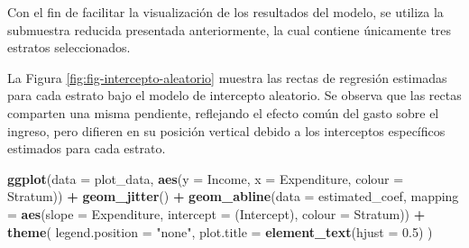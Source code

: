 \documentclass[
  spanish,
  12pt,
]{book}
\newenvironment{Shaded}{\begin{snugshade}}{\end{snugshade}}
\newcommand{\AttributeTok}[1]{\textcolor[rgb]{0.13,0.29,0.53}{#1}}
\newcommand{\FloatTok}[1]{\textcolor[rgb]{0.00,0.00,0.81}{#1}}
\newcommand{\FunctionTok}[1]{\textcolor[rgb]{0.13,0.29,0.53}{\textbf{#1}}}
\newcommand{\NormalTok}[1]{#1}
\newcommand{\OtherTok}[1]{\textcolor[rgb]{0.56,0.35,0.01}{#1}}
\newcommand{\SpecialCharTok}[1]{\textcolor[rgb]{0.81,0.36,0.00}{\textbf{#1}}}
\newcommand{\StringTok}[1]{\textcolor[rgb]{0.31,0.60,0.02}{#1}}
\newcounter{none} %
\begin{document}
Con el fin de facilitar la visualización de los resultados del modelo, se utiliza la submuestra reducida presentada anteriormente, la cual contiene únicamente tres estratos seleccionados.

\begin{Shaded}
\end{Shaded}

La Figura \ref{fig:fig-intercepto-aleatorio} muestra las rectas de regresión estimadas para cada estrato bajo el modelo de intercepto aleatorio. Se observa que las rectas comparten una misma pendiente, reflejando el efecto común del gasto sobre el ingreso, pero difieren en su posición vertical debido a los interceptos específicos estimados para cada estrato.

\begin{Shaded}
\begin{Highlighting}[]
\FunctionTok{ggplot}\NormalTok{(}\AttributeTok{data =}\NormalTok{ plot\_data,}
       \FunctionTok{aes}\NormalTok{(}\AttributeTok{y =}\NormalTok{ Income, }\AttributeTok{x =}\NormalTok{ Expenditure, }\AttributeTok{colour =}\NormalTok{ Stratum)) }\SpecialCharTok{+}
  \FunctionTok{geom\_jitter}\NormalTok{() }\SpecialCharTok{+}
  \FunctionTok{geom\_abline}\NormalTok{(}\AttributeTok{data =}\NormalTok{ estimated\_coef,}
              \AttributeTok{mapping =} \FunctionTok{aes}\NormalTok{(}\AttributeTok{slope =}\NormalTok{ Expenditure,}
                            \AttributeTok{intercept =} \StringTok{\textasciigrave{}}\AttributeTok{(Intercept)}\StringTok{\textasciigrave{}}\NormalTok{,}
                            \AttributeTok{colour =}\NormalTok{ Stratum)) }\SpecialCharTok{+}
  \FunctionTok{theme}\NormalTok{(}
    \AttributeTok{legend.position =} \StringTok{"none"}\NormalTok{,}
    \AttributeTok{plot.title =} \FunctionTok{element\_text}\NormalTok{(}\AttributeTok{hjust =} \FloatTok{0.5}\NormalTok{)}
\NormalTok{  )}
\end{Highlighting}
\end{Shaded}
\end{document}
